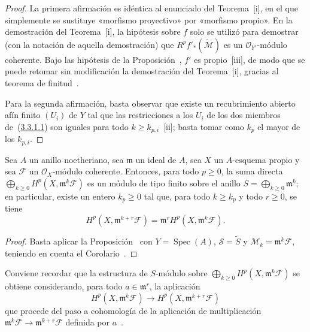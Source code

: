 \begin{proof}
La primera afirmación es idéntica al enunciado del Teorema~[i], en el que simplemente se sustituye «morfismo proyectivo» por «morfismo propio».
En la demostración del Teorema~[i], la hipótesis sobre $f$ solo se utilizó para demostrar (con la notación de aquella demostración) que $R^pf'_*(\widetilde{\mathcal M})$ es un $\mathcal O_{Y'}$-módulo coherente.
Bajo las hipótesis de la Proposición~, $f'$ es propio~[iii], de modo que se puede retomar sin modificación la demostración del Teorema~[i], gracias al teorema de finitud~.

Para la segunda afirmación, basta observar que existe un recubrimiento abierto afín finito $(U_i)$ de $Y$ tal que las restricciones a los $U_i$ de los dos miembros de~(\hyperref[III.3.3.1.1]{3.3.1.1}) son iguales para todo $k\geq k_{p,i}$~[ii]; basta tomar como $k_p$ el mayor de los $k_{p,i}$.
\end{proof}

\begin{corollary}[3.3.2]
\label{III.3.3.2}
\label{III.3.3.2-fr}
Sea $A$ un anillo noetheriano, sea $\mathfrak m$ un ideal de $A$, sea $X$ un $A$-esquema propio y sea $\mathcal F$ un $\mathcal O_X$-módulo coherente.
Entonces, para todo $p\geq0$, la suma directa $\bigoplus_{k\geq0}H^p(X,\mathfrak m^k\mathcal F)$ es un módulo de tipo finito sobre el anillo $S=\bigoplus_{k\geq0}\mathfrak m^k$; en particular, existe un entero $k_p\geq0$ tal que, para todo $k\geq k_p$ y todo $r\geq0$, se tiene
\[
H^p(X,\mathfrak m^{k+r}\mathcal F)
=\mathfrak m^rH^p(X,\mathfrak m^k\mathcal F).
\tag{3.3.2.1}\label{III.3.3.2.1-fr}
\]
\end{corollary}

\begin{proof}
Basta aplicar la Proposición~ con $Y=\operatorname{Spec}(A)$, $\mathcal S=\widetilde S$ y $\mathcal M_k=\mathfrak m^k\mathcal F$, teniendo en cuenta el Corolario~.
\end{proof}

Conviene recordar que la estructura de $S$-módulo sobre $\bigoplus_{k\geq0}H^p(X,\mathfrak m^k\mathcal F)$ se obtiene considerando, para todo $a\in\mathfrak m^r$, la aplicación \[
H^p(X,\mathfrak m^k\mathcal F)
\longrightarrow H^p(X,\mathfrak m^{k+r}\mathcal F)
\] que procede del paso a cohomología de la aplicación de multiplicación $\mathfrak m^k\mathcal F\to\mathfrak m^{k+r}\mathcal F$ definida por $a$~.

